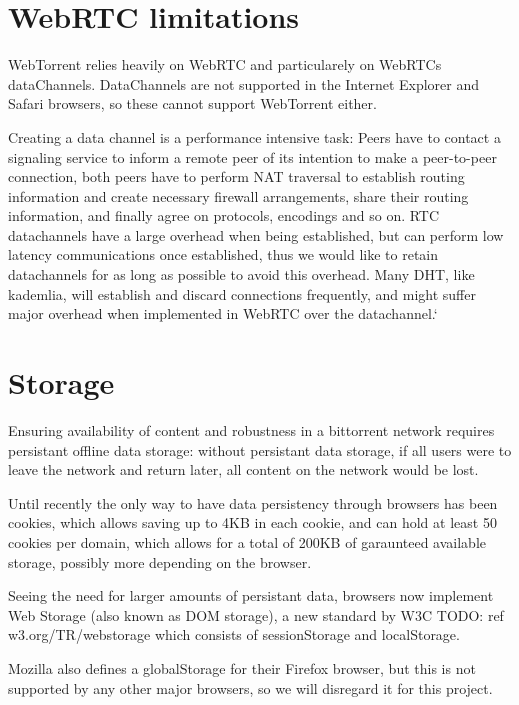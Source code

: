 \section{WebRTC limitations}
WebTorrent relies heavily on WebRTC and particularely on WebRTCs dataChannels.
DataChannels are not supported in the Internet Explorer and Safari browsers, 
so these cannot support WebTorrent either.

Creating a data channel is a performance intensive task:
Peers have to contact a signaling service to inform a remote peer of its intention
to make a peer-to-peer connection, both peers have to perform NAT traversal to establish routing information 
and create necessary firewall arrangements, share their routing information,
and finally agree on protocols, encodings and so on.
RTC datachannels have a large overhead when being established,
but can perform low latency communications once established, 
thus we would like to retain datachannels for as long as possible to avoid this overhead.
Many DHT, like kademlia, will establish and discard connections frequently,
and might suffer major overhead when implemented in WebRTC over the datachannel.`

\section{Storage}
Ensuring availability of content and robustness in a bittorrent network requires persistant offline data storage:
without persistant data storage, if all users were to leave the network and return later, all content on the 
network would be lost.
\newline

Until recently the only way to have data persistency through browsers has been cookies, 
which allows saving up to 4KB in each cookie, and can hold at least 50 cookies per domain, 
which allows for a total of 200KB of garaunteed available storage, possibly more depending on the browser.
\newline

Seeing the need for larger amounts of persistant data, browsers now implement Web Storage 
(also known as DOM storage),
a new standard by W3C
TODO: ref w3.org/TR/webstorage 
which consists of sessionStorage and localStorage.

Mozilla also defines a globalStorage for their Firefox browser, 
but this is not supported by any other major browsers, so we will disregard it for this project.

